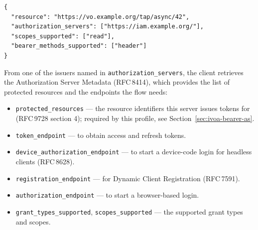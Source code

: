 \documentclass[11pt,a4paper]{ivoa}
\newcommand{\rfc}[1]{RFC\,#1}
\begin{document}
\begin{verbatim}
{
  "resource": "https://vo.example.org/tap/async/42",
  "authorization_servers": ["https://iam.example.org/"],
  "scopes_supported": ["read"],
  "bearer_methods_supported": ["header"]
}
\end{verbatim}

From one of the issuers named in \verb|authorization_servers|, the client retrieves the
Authorization Server Metadata (\rfc{8414}), which provides the list of
protected resources and the endpoints the flow needs:

\begin{itemize}
  \item \verb|protected_resources| --- the resource identifiers this server
        issues tokens for (\rfc{9728} section 4); required by this profile,
        see Section~\ref{sec:ivoa-bearer-as}.
  \item \verb|token_endpoint| --- to obtain access and refresh tokens.
  \item \verb|device_authorization_endpoint| --- to start a device-code login
        for headless clients (\rfc{8628}).
  \item \verb|registration_endpoint| --- for Dynamic Client Registration
        (\rfc{7591}).
  \item \verb|authorization_endpoint| --- to start a browser-based login.
  \item \verb|grant_types_supported|, \verb|scopes_supported| --- the supported
        grant types and scopes.
\end{itemize}
\end{document}
